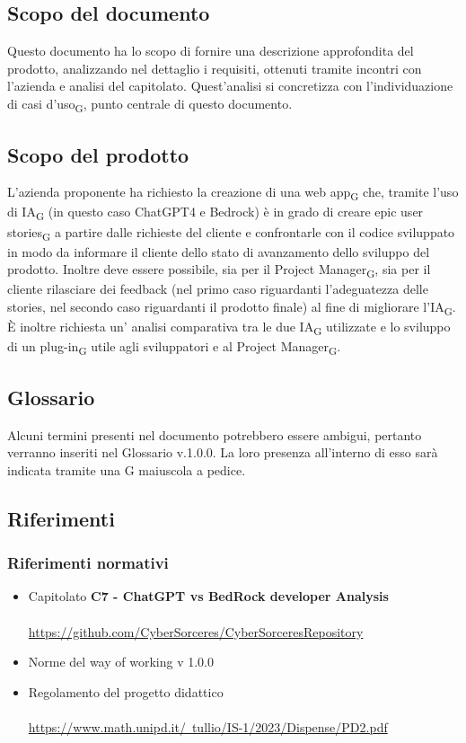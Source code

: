 \documentclass{article}
\begin{document}
\subsection*{Scopo del documento}

Questo documento ha lo scopo di fornire una descrizione approfondita del prodotto, analizzando nel dettaglio i requisiti, ottenuti tramite incontri con l'azienda e analisi del capitolato. Quest'analisi si concretizza con l'individuazione di casi d'uso\textsubscript{G}, punto centrale di questo documento.


\subsection*{Scopo del prodotto}
L'azienda proponente ha richiesto la creazione di una web app\textsubscript{G} che, tramite l'uso di IA\textsubscript{G} (in questo caso ChatGPT4 e Bedrock) è in grado di creare epic user stories\textsubscript{G} a partire dalle richieste del cliente e confrontarle con il codice sviluppato in modo da informare il cliente dello stato di avanzamento dello sviluppo del prodotto. Inoltre deve essere possibile, sia per il Project Manager\textsubscript{G}, sia per il cliente rilasciare dei feedback (nel primo caso riguardanti l'adeguatezza delle stories, nel secondo caso riguardanti il prodotto finale) al fine di migliorare l'IA\textsubscript{G}. È inoltre richiesta un' analisi comparativa tra le due IA\textsubscript{G} utilizzate e lo sviluppo di un plug-in\textsubscript{G} utile agli sviluppatori e al Project Manager\textsubscript{G}.

\subsection*{Glossario}
Alcuni termini presenti nel documento potrebbero essere ambigui, pertanto verranno inseriti nel Glossario v.1.0.0. La loro presenza all'interno di esso sarà indicata tramite una G maiuscola a pedice.

\subsection*{Riferimenti}
\subsubsection{Riferimenti normativi}
\begin{itemize}
    \item Capitolato \textbf{C7 - ChatGPT vs BedRock developer Analysis}
    \\ \\
       \href{https://github.com/CyberSorceres/CyberSorceresRepository}{https://github.com/CyberSorceres/CyberSorceresRepository} 
    \item Norme del way of working v 1.0.0
    \item Regolamento del progetto didattico \\ \\ \href{https://www.math.unipd.it/~tullio/IS-1/2023/Dispense/PD2.pdf} 
    {https://www.math.unipd.it/~tullio/IS-1/2023/Dispense/PD2.pdf}
\end{itemize}
\end{document}

